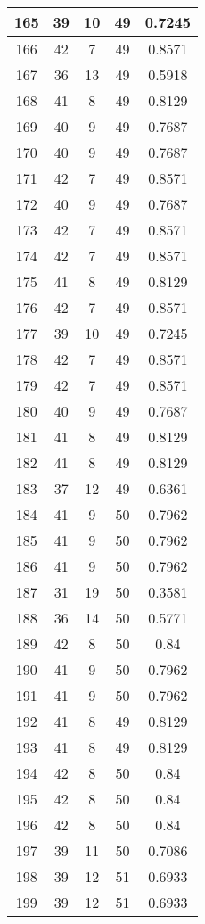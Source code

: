 \documentclass[letterpaper, 12pt]{article}
\begin{document}
\begin{longtable}{|c|c|c|c|c|}
\hline
165 & 39 & 10 & 49 & 0.7245 \\
\hline
166 & 42 & 7 & 49 & 0.8571 \\
\hline
167 & 36 & 13 & 49 & 0.5918 \\
\hline
168 & 41 & 8 & 49 & 0.8129 \\
\hline
169 & 40 & 9 & 49 & 0.7687 \\
\hline
170 & 40 & 9 & 49 & 0.7687 \\
\hline
171 & 42 & 7 & 49 & 0.8571 \\
\hline
172 & 40 & 9 & 49 & 0.7687 \\
\hline
173 & 42 & 7 & 49 & 0.8571 \\
\hline
174 & 42 & 7 & 49 & 0.8571 \\
\hline
175 & 41 & 8 & 49 & 0.8129 \\
\hline
176 & 42 & 7 & 49 & 0.8571 \\
\hline
177 & 39 & 10 & 49 & 0.7245 \\
\hline
178 & 42 & 7 & 49 & 0.8571 \\
\hline
179 & 42 & 7 & 49 & 0.8571 \\
\hline
180 & 40 & 9 & 49 & 0.7687 \\
\hline
181 & 41 & 8 & 49 & 0.8129 \\
\hline
182 & 41 & 8 & 49 & 0.8129 \\
\hline
183 & 37 & 12 & 49 & 0.6361 \\
\hline
184 & 41 & 9 & 50 & 0.7962 \\
\hline
185 & 41 & 9 & 50 & 0.7962 \\
\hline
186 & 41 & 9 & 50 & 0.7962 \\
\hline
187 & 31 & 19 & 50 & 0.3581 \\
\hline
188 & 36 & 14 & 50 & 0.5771 \\
\hline
189 & 42 & 8 & 50 & 0.84 \\
\hline
190 & 41 & 9 & 50 & 0.7962 \\
\hline
191 & 41 & 9 & 50 & 0.7962 \\
\hline
192 & 41 & 8 & 49 & 0.8129 \\
\hline
193 & 41 & 8 & 49 & 0.8129 \\
\hline
194 & 42 & 8 & 50 & 0.84 \\
\hline
195 & 42 & 8 & 50 & 0.84 \\
\hline
196 & 42 & 8 & 50 & 0.84 \\
\hline
197 & 39 & 11 & 50 & 0.7086 \\
\hline
198 & 39 & 12 & 51 & 0.6933 \\
\hline
199 & 39 & 12 & 51 & 0.6933 \\
\hline
\end{longtable}
\end{document}
